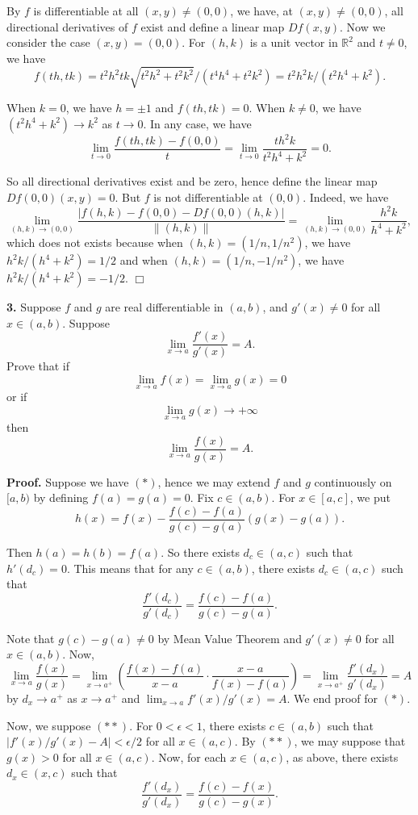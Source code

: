\documentclass{article}
\begin{document}
By $f$ is differentiable at all $(x,y) \ne (0,0)$, we have, at
$(x,y)\ne (0,0)$, all directional derivatives of $f$ exist and define a
linear map $Df(x,y)$. Now we consider the case $(x,y) = (0,0)$. For
$(h,k)$ is a unit vector in $\mathbb{R}^2$ and $t \ne 0$, we have
\[f(th,tk) = t^2h^2tk\sqrt{t^2h^2 + t^2 k^2}/(t^4h^4+t^2k^2) = t^2h^2k / (t^2h^4+k^2).\]

When $k=0$, we have $h=\pm 1$ and $f(th,tk) = 0$. When $k \ne 0$, we
have $(t^2h^4+k^2) \to k^2$ as $t\to 0$. In any case, we have
\[\lim_{t\to 0} \frac{f(th,tk)-f(0,0)}{t} = \lim_{t\to 0} \frac{th^2k}{t^2h^4+k^2} = 0.\]

So all directional derivatives exist and be zero, hence define the
linear map $Df(0,0) (x,y) = 0$. But $f$ is not differentiable at
$(0,0)$. Indeed, we have
\[\lim_{(h,k)\to (0,0)}\frac{|f(h,k) - f(0,0) - Df(0,0)(h,k)|}{\|(h,k)\|} = \lim_{(h,k)\to (0,0)} \frac{h^2k}{h^4+ k^2},\]
which does not exists because when $(h,k) = (1/n, 1/n^2)$, we have
$h^2k/(h^4+ k^2) = 1/2$ and when $(h,k) = (1/n,-1/n^2)$, we have
$h^2k/(h^4+ k^2) = -1/2$. $\Box$

    \textbf{3.} Suppose $f$ and $g$ are real differentiable in $(a,b)$, and
$g'(x) \ne 0$ for all $x\in (a,b)$. Suppose
\[\lim_{x\to a}\frac{f'(x)}{g'(x)} = A.\] Prove that if
\[\tag{*}\lim_{x\to a} f(x) = \lim_{x\to a}g(x) = 0\] or if
\[\tag{**}\lim_{x\to a} g(x) \to +\infty\] then
\[\lim_{x\to a} \frac{f(x)}{g(x)} = A.\]

    \textbf{Proof.} Suppose we have $(*)$, hence we may extend $f$ and $g$
continuously on $[a,b)$ by defining $f(a) = g(a) =0$. Fix $c \in (a,b)$.
For $x\in [a,c]$, we put
\[h(x) = f(x) - \frac{f(c) -f(a)}{g(c)-g(a)}(g(x) - g(a)).\]

Then $h(a) = h(b) = f(a)$. So there exists $d_c\in (a,c)$ such that
$h'(d_c) = 0$. This means that for any $c\in (a,b)$, there exists
$d_c \in (a,c)$ such that
\[\frac{f'(d_c)}{g'(d_c)} = \frac{f(c) - f(a)}{g(c) - g(a)}.\]

Note that $g(c) - g(a) \ne 0$ by Mean Value Theorem and $g'(x) \ne 0$
for all $x\in (a,b)$. Now,
\[\lim_{x \to a} \frac{f(x)}{g(x)} = \lim_{x \to a^+} \left(\frac{f(x) - f(a)}{x-a}\cdot \frac{x-a}{f(x) - f(a)} \right)= \lim_{x\to a^+}\frac{f'(d_x)}{g'(d_x)} = A\]
by $d_x \to a^+$ as $x\to a^+$ and $\lim_{x\to a}f'(x)/g'(x)= A.$ We end
proof for $(*)$.

Now, we suppose $(**)$. For $0<\epsilon < 1$, there exists $c \in (a,b)$
such that $|f'(x)/g'(x) - A| < \epsilon/2$ for all $x\in (a,c)$. By
$(**)$, we may suppose that $g(x) > 0$ for all $x\in (a,c)$. Now, for
each $x \in (a,c)$, as above, there exists $d_x \in (x,c)$ such that
\[\frac{f'(d_x)}{g'(d_x)} = \frac{f(c) - f(x)}{g(c) - g(x)}.\]
\end{document}
